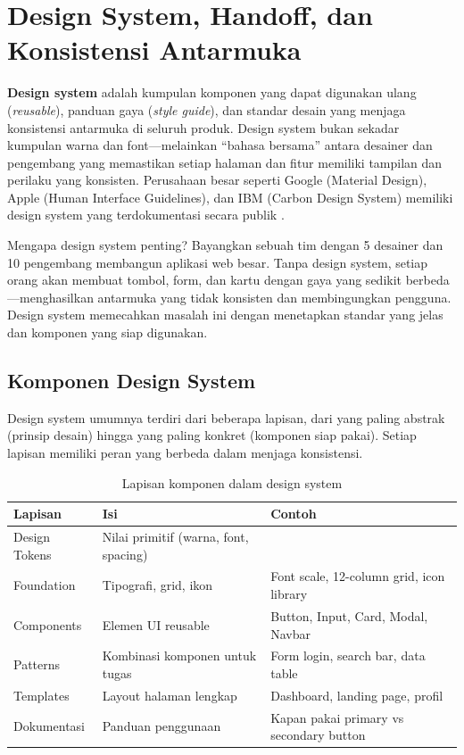 ﻿\section{Design System, Handoff, dan Konsistensi Antarmuka}

\textbf{Design system} adalah kumpulan komponen yang dapat digunakan ulang (\textit{reusable}), panduan gaya (\textit{style guide}), dan standar desain yang menjaga konsistensi antarmuka di seluruh produk. Design system bukan sekadar kumpulan warna dan font---melainkan ``bahasa bersama'' antara desainer dan pengembang yang memastikan setiap halaman dan fitur memiliki tampilan dan perilaku yang konsisten. Perusahaan besar seperti Google (Material Design), Apple (Human Interface Guidelines), dan IBM (Carbon Design System) memiliki design system yang terdokumentasi secara publik \cite{webdevLearn}.

Mengapa design system penting? Bayangkan sebuah tim dengan 5 desainer dan 10 pengembang membangun aplikasi web besar. Tanpa design system, setiap orang akan membuat tombol, form, dan kartu dengan gaya yang sedikit berbeda---menghasilkan antarmuka yang tidak konsisten dan membingungkan pengguna. Design system memecahkan masalah ini dengan menetapkan standar yang jelas dan komponen yang siap digunakan.

\subsection{Komponen Design System}

Design system umumnya terdiri dari beberapa lapisan, dari yang paling abstrak (prinsip desain) hingga yang paling konkret (komponen siap pakai). Setiap lapisan memiliki peran yang berbeda dalam menjaga konsistensi.

\begin{table}[H]
\centering
\begin{tabular}{|P{3.5cm}|P{4cm}|P{4.5cm}|}
\hline
\textbf{Lapisan} & \textbf{Isi} & \textbf{Contoh} \\
\hline
Design Tokens & Nilai primitif (warna, font, spacing) &  \\
\hline
Foundation & Tipografi, grid, ikon & Font scale, 12-column grid, icon library \\
\hline
Components & Elemen UI reusable & Button, Input, Card, Modal, Navbar \\
\hline
Patterns & Kombinasi komponen untuk tugas & Form login, search bar, data table \\
\hline
Templates & Layout halaman lengkap & Dashboard, landing page, profil \\
\hline
Dokumentasi & Panduan penggunaan & Kapan pakai primary vs secondary button \\
\hline
\end{tabular}
\caption{Lapisan komponen dalam design system}
\end{table}

